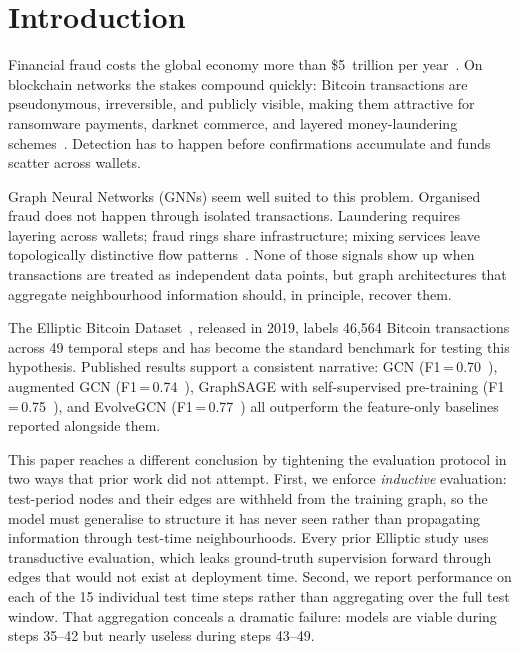 
\section{Introduction}
\label{sec:intro}

Financial fraud costs the global economy more than \$5~trillion per
year~\citep{crowe2020}.  On blockchain networks the stakes compound
quickly: Bitcoin transactions are pseudonymous, irreversible, and
publicly visible, making them attractive for ransomware payments,
darknet commerce, and layered money-laundering
schemes~\citep{meiklejohn2013bitcoin}.  Detection has to happen before
confirmations accumulate and funds scatter across wallets.

Graph Neural Networks (GNNs) seem well suited to this problem.
Organised fraud does not happen through isolated transactions.
Laundering requires layering across wallets; fraud rings share
infrastructure; mixing services leave topologically distinctive flow
patterns~\citep{akoglu2015graph}.  None of those signals show up when
transactions are treated as independent data points, but graph
architectures that aggregate neighbourhood information should, in
principle, recover them.

The Elliptic Bitcoin Dataset~\citep{weber2019}, released in 2019,
labels 46{,}564 Bitcoin transactions across 49 temporal steps and has
become the standard benchmark for testing this hypothesis.  Published
results support a consistent narrative: GCN
(F1\,=\,0.70~\citep{weber2019}), augmented GCN
(F1\,=\,0.74~\citep{alarab2020}), GraphSAGE with self-supervised
pre-training (F1\,=\,0.75~\citep{lo2023}), and EvolveGCN
(F1\,=\,0.77~\citep{pareja2020evolvegcn}) all outperform the
feature-only baselines reported alongside them.

This paper reaches a different conclusion by tightening the evaluation
protocol in two ways that prior work did not attempt.  First, we
enforce \emph{inductive} evaluation: test-period nodes and their edges
are withheld from the training graph, so the model must generalise to
structure it has never seen rather than propagating information through
test-time neighbourhoods.  Every prior Elliptic study uses transductive
evaluation, which leaks ground-truth supervision forward through edges
that would not exist at deployment time.  Second, we report performance
on each of the 15 individual test time steps rather than aggregating
over the full test window.  That aggregation conceals a dramatic
failure: models are viable during steps 35--42 but nearly useless
during steps 43--49.

